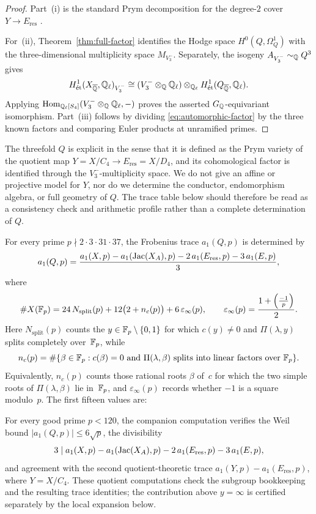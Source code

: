 \begin{proof}
Part~(i) is the standard Prym decomposition for the degree-\(2\) cover \(Y\to E_{\mathrm{res}}\) \cite{Mumford1974,LangeOrtega2011}.

For~(ii), Theorem~\ref{thm:full-factor} identifies the Hodge space \(H^0(Q,\Omega_Q^1)\) with the three-dimensional multiplicity space \(M_{V_3^-}\). Separately, the isogeny \(A_{V_3^-}\sim_{\mathbb{Q}}Q^3\) gives
\[
H^1_{\mathrm{\acute et}}(X_{\overline{\mathbb{Q}}},\mathbb{Q}_\ell)_{V_3^-}
\cong (V_3^-\otimes_{\mathbb{Q}}\mathbb{Q}_\ell)\otimes_{\mathbb{Q}_\ell}
H^1_{\mathrm{\acute et}}(Q_{\overline{\mathbb{Q}}},\mathbb{Q}_\ell).
\]
Applying \(\operatorname{Hom}_{\mathbb{Q}_\ell[S_4]}(V_3^-\otimes_{\mathbb{Q}}\mathbb{Q}_\ell,-)\) proves the asserted \(G_{\mathbb{Q}}\)-equivariant isomorphism. Part~(iii) follows by dividing \eqref{eq:automorphic-factor} by the three known factors and comparing Euler products at unramified primes.
\end{proof}

\begin{remark}\label{rem:q-limitations}
The threefold \(Q\) is explicit in the sense that it is defined as the Prym variety of the quotient map \(Y=X/C_4\to E_{\mathrm{res}}=X/D_4\), and its cohomological factor is identified through the \(V_3^-\)-multiplicity space. We do not give an affine or projective model for \(Y\), nor do we determine the conductor, endomorphism algebra, or full geometry of \(Q\). The trace table below should therefore be read as a consistency check and arithmetic profile rather than a complete determination of \(Q\).
\end{remark}

\begin{proposition}\label{prop:prym-traces}
For every prime \(p\nmid 2\cdot 3\cdot 31\cdot 37\), the Frobenius trace \(a_1(Q,p)\) is determined by
\[
a_1(Q,p)=\frac{a_1(X,p)-a_1(\operatorname{Jac}(X_A),p)-2\,a_1(E_{\mathrm{res}},p)-3\,a_1(E,p)}{3},
\]
where
\[
\#X(\mathbb{F}_p)=24\,N_{\mathrm{split}}(p)+12\bigl(2+n_c(p)\bigr)+6\,\varepsilon_\infty(p),
\qquad
\varepsilon_\infty(p)=\frac{1+\left(\frac{-1}{p}\right)}{2}.
\]
Here \(N_{\mathrm{split}}(p)\) counts the \(y\in\mathbb{F}_p\setminus\{0,1\}\) for which \(c(y)\neq 0\) and \(\Pi(\lambda,y)\) splits completely over~\(\mathbb{F}_p\), while
\[
n_c(p)=\#\{\beta\in\mathbb{F}_p:c(\beta)=0\text{ and }\Pi(\lambda,\beta)\text{ splits into linear factors over }\mathbb{F}_p\}.
\]
Equivalently, \(n_c(p)\) counts those rational roots \(\beta\) of~\(c\) for which the two simple roots of \(\Pi(\lambda,\beta)\) lie in~\(\mathbb{F}_p\), and \(\varepsilon_\infty(p)\) records whether \(-1\) is a square modulo~\(p\). The first fifteen values are:
\begin{center}

\end{center}
For every good prime \(p<120\), the companion computation verifies the Weil bound \(|a_1(Q,p)|\leq 6\sqrt{p}\), the divisibility
\[
3\mid a_1(X,p)-a_1(\operatorname{Jac}(X_A),p)-2\,a_1(E_{\mathrm{res}},p)-3\,a_1(E,p),
\]
and agreement with the second quotient-theoretic trace \(a_1(Y,p)-a_1(E_{\mathrm{res}},p)\), where \(Y=X/C_4\). These quotient computations check the subgroup bookkeeping and the resulting trace identities; the contribution above \(y=\infty\) is certified separately by the local expansion below.
\end{proposition}

